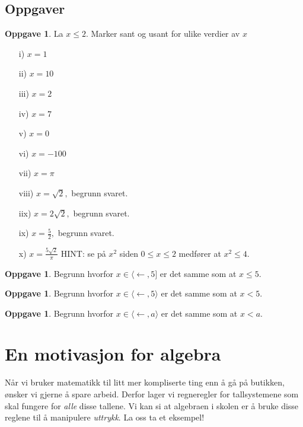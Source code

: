 \documentclass[11pt]{article}
\theoremstyle{definition}
\newtheorem{oppgave}[theorem]{Oppgave}
\theoremstyle{definition}
\def\la{\langle}
\def\ra{\rangle}
\begin{document}
\subsection{Oppgaver}

\begin{oppgave}
La $x \leq 2$. Marker sant og usant for ulike verdier av $x$
\begin{itemize}
\item[i)]
$x = 1$
\item[ii)]
$x = 10$
\item[iii)]
$x = 2$
\item[iv)]
$x = 7$
\item[v)]
$x = 0$
\item[vi)]
$x = -100$
\item[vii)]
$x = \pi$
\item[viii)]
$x = \sqrt{2},$  begrunn svaret.
\item[iix)]
$x = 2\sqrt{2},$  begrunn svaret.
\item[ix)]
$x = \frac{5}{2},$  begrunn svaret.
\item[x)]
$x = \frac{5\sqrt{2}}{\pi}$ HINT: se på $x^2$ siden 
$0\leq x\leq 2$ medfører at $x^2 \leq 4$.
\end{itemize}
\end{oppgave}

\begin{oppgave}
Begrunn hvorfor $x\in\la\leftarrow,5]$ er det samme som
at $x\leq 5$.
\end{oppgave}

\begin{oppgave}
Begrunn hvorfor $x\in\la\leftarrow,5 \ra$ er det samme som
at $x < 5$.
\end{oppgave}


\begin{oppgave}
Begrunn hvorfor $x\in\la\leftarrow,a \ra$ er det samme som
at $x < a$.
\end{oppgave}


\section{En motivasjon for algebra}

Når vi bruker matematikk til litt mer kompliserte ting enn å
gå på butikken, ønsker vi gjerne å spare arbeid. Derfor lager
vi regneregler for tallsystemene som skal fungere for \emph{alle}
disse tallene. Vi kan si at algebraen i skolen er å bruke
disse reglene til å manipulere \emph{uttrykk}. La oss ta et eksempel!
\end{document}
